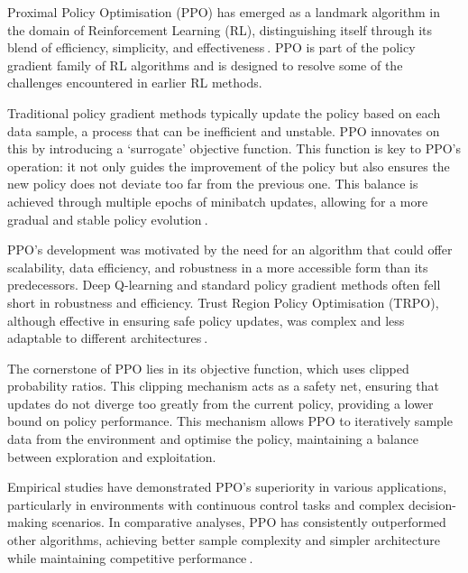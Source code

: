 
Proximal Policy Optimisation (PPO) has emerged as a landmark algorithm in the domain of Reinforcement Learning (RL), distinguishing itself through its blend of efficiency, simplicity, and effectiveness$~$\cite{schulman2017ppo}. PPO is part of the policy gradient family of RL algorithms and is designed to resolve some of the challenges encountered in earlier RL methods.

Traditional policy gradient methods typically update the policy based on each data sample, a process that can be inefficient and unstable. PPO innovates on this by introducing a `surrogate' objective function. This function is key to PPO's operation: it not only guides the improvement of the policy but also ensures the new policy does not deviate too far from the previous one. This balance is achieved through multiple epochs of minibatch updates, allowing for a more gradual and stable policy evolution$~$\cite{beznosikov2023stochastic}.

PPO's development was motivated by the need for an algorithm that could offer scalability, data efficiency, and robustness in a more accessible form than its predecessors. Deep Q-learning and standard policy gradient methods often fell short in robustness and efficiency. Trust Region Policy Optimisation (TRPO), although effective in ensuring safe policy updates, was complex and less adaptable to different architectures$~$\cite{Engstrom2020Implementation}.

The cornerstone of PPO lies in its objective function, which uses clipped probability ratios. This clipping mechanism acts as a safety net, ensuring that updates do not diverge too greatly from the current policy, providing a lower bound on policy performance. This mechanism allows PPO to iteratively sample data from the environment and optimise the policy, maintaining a balance between exploration and exploitation.

Empirical studies have demonstrated PPO's superiority in various applications, particularly in environments with continuous control tasks and complex decision-making scenarios. In comparative analyses, PPO has consistently outperformed other algorithms, achieving better sample complexity and simpler architecture while maintaining competitive performance$~$\cite{Larsen2021Comparing}.

